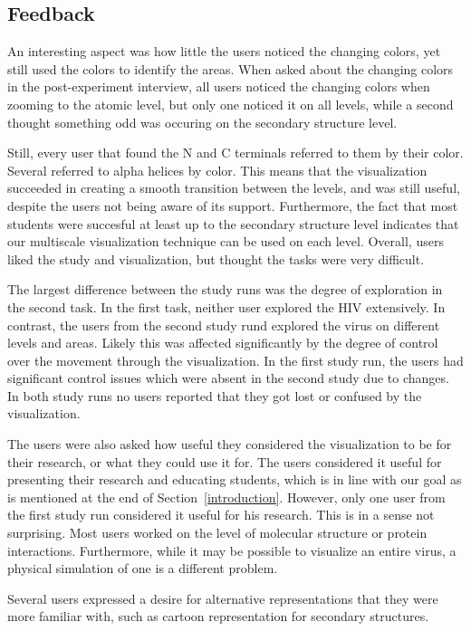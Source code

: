 \documentclass[review,journal]{vgtc}         %
\begin{document}
	
	
	
	\subsection{Feedback}
	An interesting aspect was how little the users noticed the changing colors, yet still used the colors to identify the areas.
	When asked about the changing colors in the post-experiment interview, all users noticed the changing colors when zooming to the atomic level, but only one noticed it on all levels, while a second thought something odd was occuring on the secondary structure level. 
	
	Still, every user that found the N and C terminals referred to them by their color. 
	Several referred to alpha helices by color. 
	This means that the visualization succeeded in creating a smooth transition between the levels, and was still useful, despite the users not being aware of its support. 
	Furthermore, the fact that most students were succesful at least up to the secondary structure level indicates that our multiscale visualization technique can be used on each level. 
	Overall, users liked the study and visualization, but thought the tasks were very difficult.
	
	
	The largest difference between the study runs was the degree of exploration in the second task. In the first task, neither user explored the HIV extensively. In contrast, the users from the second study rund explored the virus on different levels and areas. Likely this was affected significantly by the degree of control over the movement through the visualization. In the first study run, the users had significant control issues which were absent in the second study due to changes. In both study runs no users reported that they got lost or confused by the visualization.
	
	The users were also asked how useful they considered the visualization to be for their research, or what they could use it for. The users considered it useful for presenting their research and educating students, which is in line with our goal as is mentioned at the end of Section~\ref{introduction}. However, only one user from the first study run considered it useful for his research. This is in a sense not surprising. Most users worked on the level of molecular structure or protein interactions. Furthermore, while it may be possible to visualize an entire virus, a physical simulation of one is a different problem. 
	
	
	Several users expressed a desire for alternative representations that they were more familiar with, such as cartoon representation for secondary structures.
	
\end{document}
